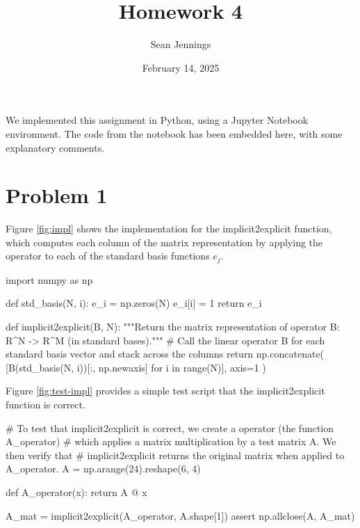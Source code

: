 \documentclass{homework}
\title{Homework 4}
\author{Sean Jennings}
\date{February 14, 2025}
\begin{document}
\maketitle

We implemented this assignment in Python, using a Jupyter Notebook
environment. The code from the notebook has been embedded here, with
some explanatory comments.

\section{Problem 1}

Figure \ref{fig:impl} shows the implementation for the implicit2explicit
function, which computes each column of the matrix representation by
applying the operator to each of the standard basis functions $e_j$.


\begin{center}

\begin{python}
import numpy as np

def std_basis(N, i):
    e_i = np.zeros(N)
    e_i[i] = 1
    return e_i

def implicit2explicit(B, N):
    """Return the matrix representation of operator B: R^N -> R^M (in standard bases)."""
    # Call the linear operator B for each standard basis vector and stack across the columns
    return np.concatenate(
        [B(std_basis(N, i))[:, np.newaxis] for i in range(N)],
        axis=1
    )
\end{python}

\label{fig:impl}
\end{center}

Figure \ref{fig:test-impl} provides a simple test script that the implicit2explicit function is correct.

    
\begin{center}
\begin{python}

# To test that implicit2explicit is correct, we create a operator (the function A_operator)
# which applies a matrix multiplication by a test matrix A. We then verify that
# implicit2explicit returns the original matrix when applied to A_operator.
A = np.arange(24).reshape(6, 4)

def A_operator(x):
    return A @ x

A_mat = implicit2explicit(A_operator, A.shape[1])
assert np.allclose(A, A_mat)
\end{python}
\label{fig:test-impl}
\end{center}
\end{document}
